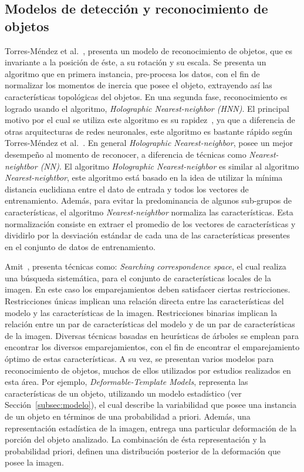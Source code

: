 \subsection{Modelos de detección y reconocimiento de objetos}
Torres-Méndez et al.~\cite{trsi2000}, presenta un modelo de reconocimiento de objetos, que es invariante a la posición de éste, a su rotación y su escala. Se presenta un algoritmo que en primera instancia, pre-procesa los datos, con el fin de normalizar los momentos de inercia que posee el objeto, extrayendo así las características topológicas del objetos. En una segunda fase, reconocimiento es logrado usando el algoritmo, \textit{Holographic Nearest-neighbor (HNN)}. El principal motivo por el cual se utiliza este algoritmo es su rapidez~\cite{trsi2000}, ya que a diferencia de otras arquitecturas de redes neuronales, este algoritmo es bastante rápido según Torres-Méndez et al.~\cite{trsi2000}. En general \textit{Holographic Nearest-neighbor}, posee un mejor desempeño al momento de reconocer, a diferencia de técnicas como \textit{Nearest-neightbor (NN)}. El algoritmo \textit{Holographic Nearest-neighbor} es similar al algoritmo \textit{Nearest-neightbor}, este algoritmo está basado en la idea de utilizar la mínima distancia euclidiana entre el dato de entrada y todos los vectores de entrenamiento. Además, para evitar la predominancia de algunos sub-grupos de características, el algoritmo \textit{Nearest-neightbor} normaliza las características. Esta normalización consiste en extraer el promedio de los vectores de características y dividirlo por la desviación estándar de cada una de las características presentes en el conjunto de datos de entrenamiento.

Amit~\cite{Amit2002}, presenta técnicas como: \textit{Searching correspondence space}, el cual realiza una búsqueda sistemática, para el conjunto de características locales de la imagen. En este caso los emparejamientos deben satisfacer ciertas restricciones. Restricciones únicas implican una relación directa entre las características del modelo y las características de la imagen. Restricciones binarias implican la relación entre un par de características del modelo y de un par de características de la imagen. Diversas técnicas basadas en heurísticas de árboles se emplean para encontrar los diversos emparejamientos, con el fin de encontrar el emparejamiento óptimo de estas características. A su vez, se presentan varios modelos para reconocimiento de objetos, muchos de ellos utilizados por estudios realizados en esta área. Por ejemplo, \textit{Deformable-Template Models}, representa las características de un objeto, utilizando un modelo estadístico (ver Sección~\ref{subsec:modelo}), el cual describe la variabilidad que posee una instancia de un objeto en términos de una probabilidad a priori. Además, una representación  estadística de la imagen, entrega una particular deformación de la porción del objeto analizado. La combinación de ésta representación y la probabilidad priori, definen una distribución posterior de la deformación que posee la imagen.

